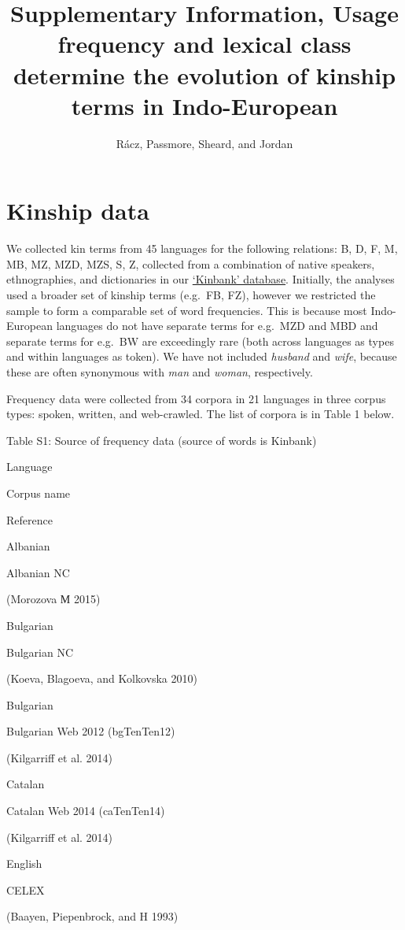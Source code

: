 \documentclass[]{article}
\title{Supplementary Information, Usage frequency and lexical class determine
the evolution of kinship terms in Indo-European}
\author{Rácz, Passmore, Sheard, and Jordan}
\date{}
\begin{document}
\maketitle

{
\setcounter{tocdepth}{2}
\tableofcontents
}
\section{Kinship data}\label{kinship-data}

We collected kin terms from 45 languages for the following relations: B,
D, F, M, MB, MZ, MZD, MZS, S, Z, collected from a combination of native
speakers, ethnographies, and dictionaries in our
\href{https://excd.org/research-activities/kinbank/}{`Kinbank'
database}. Initially, the analyses used a broader set of kinship terms
(e.g.~FB, FZ), however we restricted the sample to form a comparable set
of word frequencies. This is because most Indo-European languages do not
have separate terms for e.g.~MZD and MBD and separate terms for e.g.~BW
are exceedingly rare (both across languages as types and within
languages as token). We have not included \emph{husband} and
\emph{wife}, because these are often synonymous with \emph{man} and
\emph{woman}, respectively.

Frequency data were collected from 34 corpora in 21 languages in three
corpus types: spoken, written, and web-crawled. The list of corpora is
in Table 1 below.

Table S1: Source of frequency data (source of words is Kinbank)

Language

Corpus name

Reference

Albanian

Albanian NC

(Morozova М 2015)

Bulgarian

Bulgarian NC

(Koeva, Blagoeva, and Kolkovska 2010)

Bulgarian

Bulgarian Web 2012 (bgTenTen12)

(Kilgarriff et al. 2014)

Catalan

Catalan Web 2014 (caTenTen14)

(Kilgarriff et al. 2014)

English

CELEX

(Baayen, Piepenbrock, and H 1993)
\end{document}
